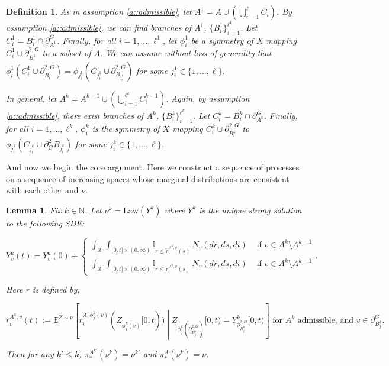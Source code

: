 \documentclass[12pt]{article}
\newcommand{\mb}{\mathbb}
\newcommand{\mc}{\mathcal}
\newcommand{\ov}{\overline}
\newcommand{\te}{\text}
\newcommand{\ind}{\hspace{24pt}}
\newcommand{\exmu}[2]{\mb{E}^{#1}\left[#2\right]}	%
\newcommand{\defeq}{:=}								%
\newcommand{\sta}{\mc{X}}							%
\newcommand{\dneigh}[1]{\partial^2_{#1}}			%
\newcommand{\gneigh}[2]{\partial^{#1}_{#2}}			%
\newcommand{\dgneigh}[2]{\partial^{2,#1}_{#2}}		%
\newcommand{\cl}[1]{\ov{#1}}						%
\newcommand{\indx}[1]{^{#1}}						%
\newcommand{\Xf}{X}									%
\newcommand{\poiss}{N}								%
\newcommand{\Sm}{\ell}								%
\newcommand{\rate}{r}								%
\newcommand{\proj}{\pi}								%
\newcommand{\poissv}[1]{_{#1}}						%
\newcommand{\vind}[1]{_{#1}}						%
\newcommand{\tme}[1]{(#1)}							%
\newcommand{\tmi}[1]{#1}							%
\newcommand{\vpara}[1]{^{#1}}						%
\newcommand{\stpara}[1]{_{#1}}						%
\newcommand{\gvpara}[2]{^{#1,#2}}					%
\newcommand{\psf}{_*}								%
\newcommand{\Xg}{Y}									%
\newcommand{\brate}{\alt{\rate}}					%
\newcommand{\alt}[1]{\tilde{#1}}					%
\newcommand{\mm}{\nu}								%
\newcommand{\law}{\te{Law}}							%
\newcommand{\Xh}{Z}									%
\newtheorem{lem}[thms]{Lemma}
\newtheorem{defn}[thms]{Definition}
\begin{document}
\begin{defn}
As in assumption \ref{a::admissible}, let \(A\indx{1} = A\cup\left(\bigcup_{i=1}^\Sm C_i\right)\). By assumption \ref{a::admissible}, we can find branches of \(A\indx{1}\), \(\{B_i\indx{1}\}_{i=1}^{\Sm\indx{1}}\). Let \(C_i\indx{1} = B_i\indx{1}\cap\gneigh{G}{A\indx{1}}\). Finally, for all \(i = 1,\dots,\Sm\indx{1}\), let \(\phi_i\indx{1}\) be a symmetry of \(\Xf\) mapping \(C_i\indx{1}\cup \dgneigh{G}{B\indx{1}_i}\) to a subset of \(A\). We can assume without loss of generality that \(\phi_i\indx{1}(C_i\indx{1}\cup \dgneigh{G}{B\indx{1}_i}) = \phi_{j\indx{1}_i}(C_{j\indx{1}_i}\cup\dgneigh{G}{B_{j\indx{1}_i}})\) for some \(j\indx{1}_i \in \{1,\dots,\Sm\}\).

\ind In general, let \(A\indx{k} = A\indx{k-1} \cup \left(\bigcup_{i=1}^{\Sm\indx{k}} C_i\indx{k-1}\right)\). Again, by assumption \ref{a::admissible}, there exist branches of \(A\indx{k}\), \(\{B_i\indx{k}\}_{i=1}^{\Sm\indx{k}}\). Let \(C_i\indx{k} = B_i\indx{k}\cap \gneigh{G}{A\indx{k}}\). Finally, for all \(i=1,\dots,\Sm\indx{k}\), \(\phi_i\indx{k}\) is the symmetry of \(\Xf\) mapping \(C_i\indx{k}\cup\dgneigh{G}{B_i\indx{k}}\) to \(\phi_{j\indx{k}_i}(C_{j\indx{k}_i}\cup\dneigh{G}{B_{j\indx{k}_i}})\) for some \(j\indx{k}_i \in \{1,\dots,\Sm\}\).
\label{Uq::Extnot}
\end{defn}

And now we begin the core argument. Here we construct a sequence of processes on a sequence of increasing spaces whose marginal distributions are consistent with each other and \(\mm\).

\begin{lem}
Fix \(k \in \mb{N}\). Let \(\mm\indx{k} = \law(\Xg\indx{k})\) where \(\Xg\indx{k}\) is the unique strong solution to the following SDE:

\begin{equation}
\Xg\indx{k}\vind{v}\tme{t} = \Xg\indx{k}\vind{v}\tme{0} + 
\begin{cases}
\int_\sta\int_{(0,t]\times(0,\infty)} \mb{I}_{r \leq \brate\gvpara{A\indx{k}}{v}\stpara{i}\tme{s}}\,\poiss\poissv{v}(dr,ds,di) &\te{ if } v \in A\indx{k}\setminus A\indx{k-1}\\
\int_\sta\int_{(0,t]\times(0,\infty)} \mb{I}_{r \leq \rate\gvpara{A\indx{k}}{v}\stpara{i}\tme{s}}\,\poiss\poissv{v}(dr,ds,di) &\te{ if } v \in A\indx{k}\setminus A\indx{k-1}
\end{cases}.
\label{Uq::exteqn}
\end{equation}

Here \(\brate\) is defined by,

\[\brate\gvpara{A\indx{k}}{v}\stpara{i}(t) \defeq \exmu{\Xh\sim \mm}{\rate\gvpara{A}{\phi_j\indx{k}(v)}\stpara{i}(\Xh\vind{\cl{\phi_j\indx{k}(v)}}\tmi{[0,t)})\middle|\Xh\vind{\phi_j\indx{k}\left(\dgneigh{G}{B\indx{k}_j}\right)}\tmi{[0,t)} = \Xg\indx{k}\vind{\dgneigh{G}{B\indx{k}_j}}\tmi{[0,t)}} \te{ for } A\indx{k}\te{ admissible, and } v \in \gneigh{G}{B\indx{k}_j}.\]

Then for any \(k' \leq k\), \(\proj\psf\vpara{A\indx{k'}}(\mm\indx{k}) = \mm\indx{k'}\) and \(\proj\psf\vpara{A}(\mm\indx{k}) = \mm\).
\label{Uq::ext}
\end{lem}
\end{document}
